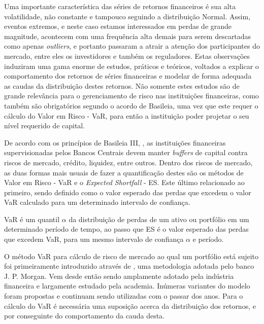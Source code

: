 \documentclass[review]{elsarticle}
\theoremstyle{definition}
\begin{document}
Uma importante característica das séries de retornos financeiros é sua alta volatilidade, não constante e tampouco seguindo a distribuição Normal. Assim, eventos extremos, e neste caso estamos interessados em perdas de grande magnitude, acontecem com uma frequência alta demais para serem descartadas como apenas \emph{outliers}, e portanto passaram a atrair a atenção dos participantes do mercado, entre eles os investidores e também os reguladores. Estas observações induziram uma gama enorme de estudos, práticos e teóricos, voltados a explicar o comportamento dos retornos de séries financeiras e modelar de forma adequada as caudas da distribuição destes retornos. Não somente estes estudos são de grande relevância para o gerenciamento de risco nas instituições financeiras, como também são obrigatórios segundo o acordo de Basileia, uma vez que este requer o cálculo do Valor em Risco - VaR, para então a instituição poder projetar o seu nível requerido de capital. 

De acordo com os princípios de Basileia III, \cite{BCBS2011, BCBS2013, BCBS2014}, as instituições financeiras supervisionadas pelos Bancos Centrais devem manter \emph{buffers} de capital contra riscos de mercado, crédito, liquidez, entre outros. Dentro dos riscos de mercado, as duas formas mais usuais de fazer a quantificação destes são os métodos de Valor em Risco - VaR e o \emph{Expected Shortfall} - ES. Este último relacionado ao primeiro, sendo definido como o valor esperado das perdas que excedem o valor VaR calculado para um determinado intervalo de confiança.

VaR é um quantil $\alpha$ da distribuição de perdas de um ativo ou portfólio em um determinado período de tempo, ao passo que ES é o valor esperado das perdas que excedem VaR, para um mesmo intervalo de confiança $\alpha$ e período.

O método VaR para cálculo de risco de mercado ao qual um portfólio está sujeito foi primeiramente introduzido através de \cite{RiskMetrics1995}, uma metodologia adotada pelo banco J. P. Morgan. Vem desde então sendo amplamente adotado pela indústria financeira e largamente estudado pela academia. Inúmeras variantes do modelo foram propostas e continuam sendo utilizadas com o passar dos anos. Para o cálculo do VaR é necessária uma suposição acerca da distribuição dos retornos, e por conseguinte do comportamento da cauda desta.
\end{document}
